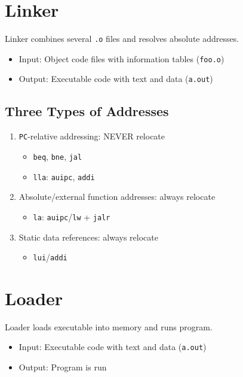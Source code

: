 \section{Linker}
Linker combines several \texttt{.o} files and resolves absolute addresses.
\begin{itemize}
    \item Input: Object code files with information tables (\texttt{foo.o})
    \item Output: Executable code with text and data (\texttt{a.out})
\end{itemize}

\subsection{Three Types of Addresses}
\begin{enumerate}
		\item \texttt{PC}-relative addressing: NEVER relocate
			\begin{itemize}
				\item \texttt{beq}, \texttt{bne}, \texttt{jal}
				\item \texttt{lla}: \texttt{auipc}, \texttt{addi}
			\end{itemize}
		\item Absolute/external function addresses: always relocate
			\begin{itemize}
				\item \texttt{la}: \texttt{auipc}/\texttt{lw} + \texttt{jalr}
			\end{itemize}
		\item Static data references: always relocate
			\begin{itemize}
				\item \texttt{lui}/\texttt{addi}
			\end{itemize}
\end{enumerate}

\section{Loader}
Loader loads executable into memory and runs program.
\begin{itemize}
    \item Input: Executable code with text and data (\texttt{a.out})
    \item Output: Program is run
\end{itemize}


